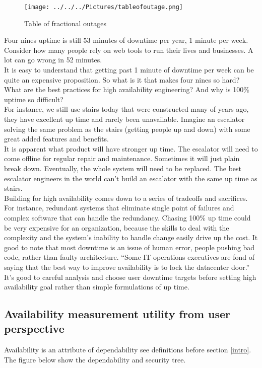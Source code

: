 \documentclass[english]{tktltiki2}
\theoremstyle{definition}
\theoremstyle{remark}
\begin{document}
\begin{figure}[h!]
\texttt{[image: ../../../Pictures/tableofoutage.png]} 
\caption{Table of fractional outages \cite{AAMES}}
\label{fig:AA} 
\end{figure}

\pagebreak
Four nines uptime is still 53 minutes of downtime per year, 1 minute per week. Consider how many people rely on web tools to run their lives and businesses. A lot can go wrong in 52 minutes.\\
It is easy to understand that getting past 1 minute of downtime per week can be quite an expensive proposition. So what is it that makes four nines so hard? What are the best practices for high availability engineering? And why is 100\% uptime so difficult?\\
For instance, we still use stairs today that were constructed many of years ago, they have  excellent up time and rarely been unavailable. Imagine an escalator solving the same problem as the stairs (getting people up and down) with some great added features and benefits.\\
It is apparent what product will have stronger up time. The escalator will need to come offline for regular repair and maintenance. Sometimes it will just plain break down. Eventually, the whole system will need to be replaced. The best escalator engineers in the world can’t build an escalator with the same up time as stairs.\\
Building for high availability comes down to a series of tradeoffs and sacrifices. For instance, redundant systems that eliminate single point of failures and complex software that can handle the redundancy. Chasing 100\% up time could be very expensive for an organization, because the skills to deal with the complexity and the system's inability to handle change easily drive up the cost.
It good to note that most downtime is an issue of human error, people pushing bad code, rather than faulty architecture. 
“Some IT operations executives are fond of saying that the best way to improve availability is to lock the datacenter door.”\\
It’s good to careful analysis and choose user downtime targets before setting high availability goal rather than simple formulations of up time.



\subsection{Availability measurement utility from user perspective}
Availability is an attribute of dependability \cite{Avizienis2004BasicCA}
see definitions before section \ref{intro}. The figure below show the dependability and security tree.
\end{document}
